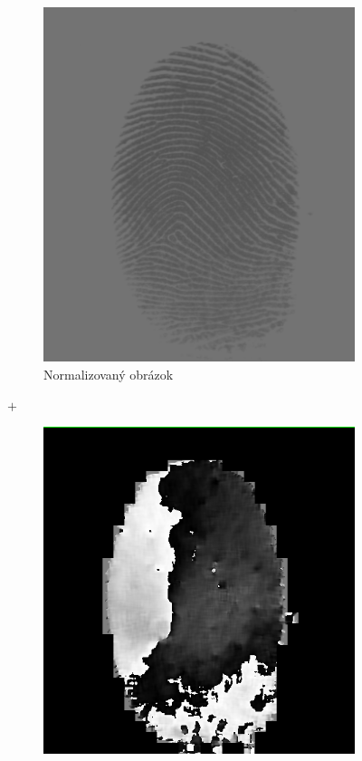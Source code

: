 \documentclass[11pt,a4paper]{article}
\begin{document}
\begin{figure}[h!]
	\centering
	\begin{subfigure}{0.3\textwidth}
		\centering
		\includegraphics[width=.95\linewidth]{images/Screenshot_8}
		\caption{Normalizovaný obrázok}
	\end{subfigure}%
	{\LARGE$+$}
	\begin{subfigure}{0.3\textwidth}
		\centering
		\includegraphics[width=\linewidth]{images/Screenshot_10}

\end{subfigure}
\end{figure}
\end{document}
